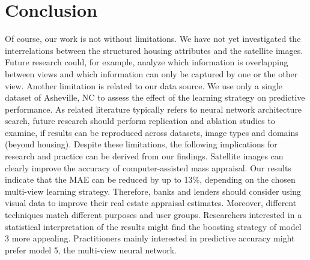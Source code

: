 \documentclass[letterpaper]{article}
\begin{document}
\section{Conclusion}
Of course, our work is not without limitations. We have not yet investigated the interrelations between the structured housing attributes and the satellite images. Future research could, for example, analyze which information is overlapping between views and which information can only be captured by one or the other view. Another limitation is related to our data source. We use only a single dataset of Asheville, NC to assess the effect of the learning strategy on predictive performance. As related literature typically refers to neural network architecture search, future research should perform replication and ablation studies to examine, if results can be reproduced across datasets, image types and domains (beyond housing).  Despite these limitations, the following implications for research and practice can be derived from our findings. Satellite images can clearly improve the accuracy of computer-assisted mass appraisal. Our results indicate that the MAE can be reduced by up to 13\%, depending on the chosen multi-view learning strategy. Therefore, banks and lenders should consider using visual data to improve their real estate appraisal estimates. Moreover, different techniques match different purposes and user groups. Researchers interested in a statistical interpretation of the results might find the boosting strategy of model 3 more appealing. Practitioners mainly interested in predictive accuracy might prefer model 5, the multi-view neural network.
\end{document}

